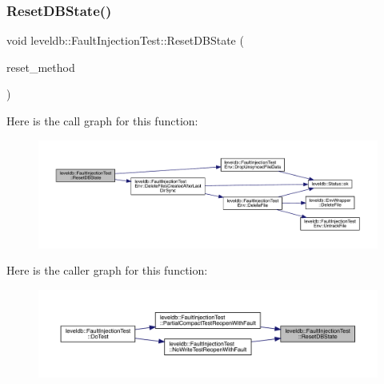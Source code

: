\subsubsection{\texorpdfstring{ResetDBState()}{ResetDBState()}}
{\footnotesize\ttfamily void leveldb\+::\+Fault\+Injection\+Test\+::\+Reset\+D\+B\+State (\begin{DoxyParamCaption}\item[{\mbox{\hyperlink{classleveldb_1_1_fault_injection_test_a316891ca042a42e0d26ec45450828cc3}{Reset\+Method}}}]{reset\+\_\+method }\end{DoxyParamCaption})\hspace{0.3cm}{\ttfamily [inline]}}

Here is the call graph for this function\+:
\nopagebreak
\begin{figure}[H]
\begin{center}
\leavevmode
\includegraphics[width=350pt]{classleveldb_1_1_fault_injection_test_a15c8b348e0d0569b2dbd5065386e7405_cgraph}
\end{center}
\end{figure}
Here is the caller graph for this function\+:
\nopagebreak
\begin{figure}[H]
\begin{center}
\leavevmode
\includegraphics[width=350pt]{classleveldb_1_1_fault_injection_test_a15c8b348e0d0569b2dbd5065386e7405_icgraph}
\end{center}
\end{figure}
\mbox{\label{classleveldb_1_1_fault_injection_test_ad89bbc5e5caf77e0c7a983005afe1dad}} 
